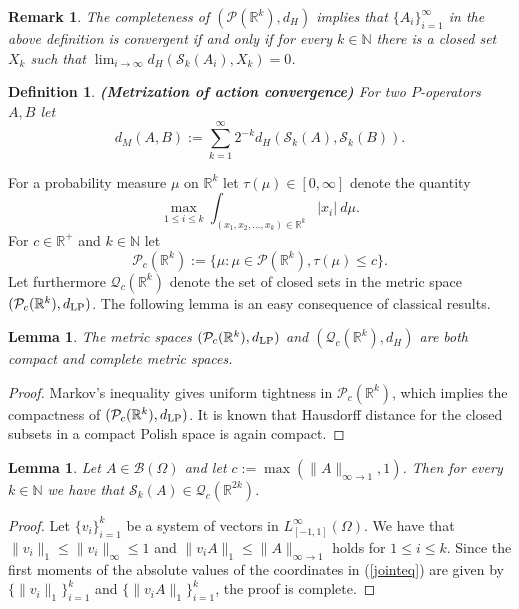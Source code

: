 \documentclass[a4wider]{amsart}
\newtheorem{definition}[theorem]{Definition}
\newtheorem{lemma}[theorem]{Lemma}
\newtheorem{remarka}[theorem]{Remark}
\theoremstyle{definitionbreak}\newtheorem{D}[theorem]{Definition}
\theoremstyle{definitionbreak}\newtheorem*{D*}{Definition}
\begin{document}
\begin{remarka} The completeness of $(\mathcal{P}(\mathbb{R}^k),d_H)$ implies that $\{A_i\}_{i=1}^\infty$ in the above definition is convergent if and only if for every $k\in\mathbb{N}$ there is a closed set $X_k$ such that $\lim_{i\to\infty} d_H(\mathcal{S}_k(A_i),X_k)=0$.
\end{remarka}


\begin{definition} {\bf (Metrization of action convergence)} For two $P$-operators $A,B$ let 
\begin{equation}\label{dmetric}
d_M(A,B):=\sum_{k=1}^\infty 2^{-k} d_H(\mathcal{S}_k(A),\mathcal{S}_k(B)).
\end{equation}
\end{definition}

For a probability measure $\mu$ on $\mathbb{R}^k$ let $\tau(\mu)\in [0,\infty]$ denote the quantity \begin{equation}\label{eq:tau}\max_{1\leq i\leq k} \int_{(x_1,x_2,\dots,x_k)\in\mathbb{R}^k}|x_i|~d\mu.\end{equation} For $c\in\mathbb{R}^+$ and $k\in\mathbb{N}$ let 
$$\mathcal{P}_c(\mathbb{R}^k):=\{\mu : \mu\in\mathcal{P}(\mathbb{R}^k) , \tau(\mu)\leq c\}.$$
Let furthermore $\mathcal{Q}_c(\mathbb{R}^k)$ denote the set of closed sets in the metric space $(\mathcal{P}_c(\mathbb{R}^k),d_{\rm LP})$. The following lemma is an easy consequence of classical results. 

\begin{lemma}\label{limitlem1} The metric spaces $(\mathcal{P}_c(\mathbb{R}^k),d_{\rm LP})$ and $(\mathcal{Q}_c(\mathbb{R}^k),d_H)$ are both compact and complete metric spaces.
\end{lemma}

\begin{proof} Markov's inequality gives uniform tightness in $\mathcal{P}_c(\mathbb{R}^k)$, which implies the compactness of $(\mathcal{P}_c(\mathbb{R}^k),d_{\rm LP})$. It is known that Hausdorff distance for the closed subsets in a compact Polish space is again compact.
\end{proof}


\begin{lemma}\label{limitlem2} Let $A\in\mathcal{B}(\Omega)$ and let $c:=\max(\|A\|_{\infty\to1},1)$. Then for every $k\in\mathbb{N}$ we have that $\mathcal{S}_k(A)\in \mathcal{Q}_c(\mathbb{R}^{2k})$.
\end{lemma}

\begin{proof} Let $\{v_i\}_{i=1}^k$ be a system of vectors in $L^\infty_{[-1,1]}(\Omega)$. We have that $\|v_i\|_1\leq \|v_i\|_\infty\leq 1$ and $\|v_iA\|_1\leq \|A\|_{\infty\to 1}$  holds for $1\leq i\leq k$. Since the first moments of the absolute values of the coordinates in (\ref{jointeq}) are given by $\{\|v_i\|_1\}_{i=1}^k$ and $\{\|v_iA\|_1\}_{i=1}^k$,  the proof is complete.
\end{proof}
\end{document}
